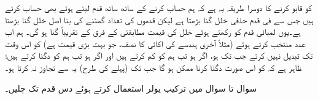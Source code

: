  کو قابو کرنے کا دوسرا طریقہ یہ ہے کہ ہم حساب کرنے کے ساتھ ساتھ قدم  لیتے ہوئے بھی حساب کرتے ہیں جس سے فی قدم حذفی خلل
   گنا بڑھتا ہے لیکن قدموں کی تعداد گھٹنے کی بنا اصل خلل  گنا بڑھتا ہے۔یوں لمبائی قدم  کو  رکھتے ہوئے خلل کی قیمت مطابقتی  کے فرق   کے تقریباً  گنا ہو گی۔ ہم اب عدد  منتخب کرتے ہوئے (مثلاً آخری ہندسے کی اکائی کا نصف، جو بہت بڑی قیمت ہے)  کو اس وقت تک تبدیل نہیں کرتے جب تک  ہو، اگر  ہو تب ہم  کو  کم کرتے ہیں اور اگر  ہو تب ہم  کو دگنا کرتے ہیں؛  ظاہر ہے کہ  کو اس صورت دگنا کرنا ممکن ہو گا جب تک  (پہلے کی طرح) یہ  سے تجاوز نہ کرتا ہو۔

سوال  تا سوال  میں ترکیب یولر استعمال کرتے ہوئے دس قدم تک چلیں۔ 

